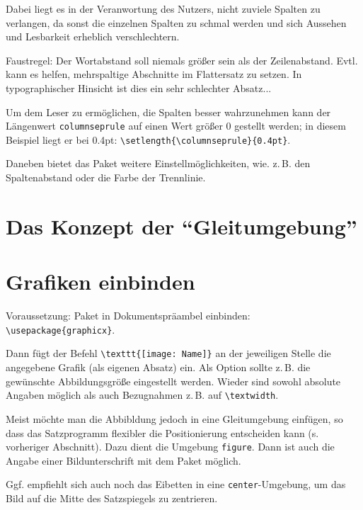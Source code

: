 \setlength{\columnseprule}{0.4pt}
\begin{multicols}{3}
 Dabei liegt es in der Veranwortung des Nutzers, nicht zuviele Spalten zu verlangen,
 da sonst die einzelnen Spalten zu schmal werden und sich Aussehen und Lesbarkeit erheblich
 verschlechtern.
 
 Faustregel: Der Wortabstand soll niemals größer sein als der Zeilenabstand.
 Evtl. kann es helfen, mehrspaltige Abschnitte im Flattersatz zu setzen.
 In typographischer Hinsicht ist dies ein sehr schlechter Absatz...
 
 Um dem Leser zu ermöglichen, die Spalten besser wahrzunehmen kann der Längenwert 
 \lstinline/columnseprule/ auf einen Wert größer 0 gestellt werden;
 in diesem Beispiel liegt er bei 0.4pt: \lstinline/\setlength{\columnseprule}{0.4pt}/.
 
 Daneben bietet das Paket weitere Einstellmöglichkeiten, wie. z.\,B. den Spaltenabstand
 oder die Farbe der Trennlinie.
\end{multicols}



\section{Das Konzept der \enquote{Gleitumgebung}}


\section{Grafiken einbinden}

Voraussetzung: Paket  in Dokumentspräambel einbinden:
\lstinline/\usepackage{graphicx}/.

Dann fügt der Befehl \lstinline/\texttt{[image: Name]}/ an der jeweiligen Stelle
die angegebene Grafik (als eigenen Absatz) ein.
Als Option sollte z.\,B. die gewünschte Abbildungsgröße eingestellt werden.
Wieder sind sowohl absolute Angaben möglich als auch Bezugnahmen z.\,B. auf 
\lstinline/\textwidth/.

Meist möchte man die Abbibldung jedoch in eine Gleitumgebung einfügen, so dass das Satzprogramm
flexibler die Positionierung entscheiden kann (s. vorheriger Abschnitt).
Dazu dient die Umgebung \lstinline/figure/.
Dann ist auch die Angabe einer Bildunterschrift mit dem Paket  möglich.

Ggf. empfiehlt sich auch noch das Eibetten in eine \lstinline/center/-Umgebung,
um das Bild auf die Mitte des Satzspiegels zu zentrieren.

